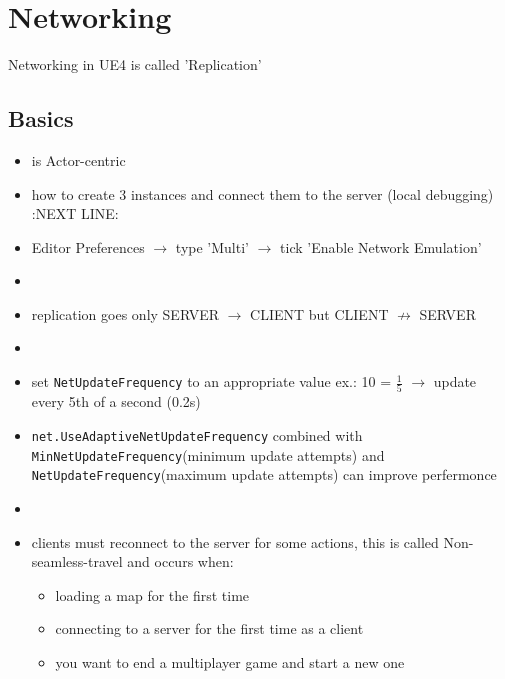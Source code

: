 \chapter{Networking}
    Networking in UE4 is called 'Replication'

    \section{Basics}
        \begin{itemize}
            \item is Actor-centric
            \item how to create 3 instances and connect them to the server (local debugging) :NEXT LINE:
            \item Editor Preferences $\rightarrow$ type 'Multi' $\rightarrow$ tick 'Enable Network Emulation'
            \item 
            \item replication goes only SERVER $\rightarrow$ CLIENT but CLIENT $\nrightarrow$ SERVER
            \item 
            \item set \colorbox{mygray}{\lstinline{NetUpdateFrequency}} to an appropriate value ex.: 10 = $\frac{1}{5}$ $\rightarrow$ update every 5th of a second (0.2s)
            \item \colorbox{mygray}{\lstinline{net.UseAdaptiveNetUpdateFrequency}} combined with \colorbox{mygray}{\lstinline{MinNetUpdateFrequency}}(minimum update attempts) and \colorbox{mygray}{\lstinline{NetUpdateFrequency}}(maximum update attempts) can improve perfermonce
            \item 
            \item clients must reconnect to the server for some actions, this is called Non-seamless-travel and occurs when:
            \begin{itemize}
                \item loading a map for the first time
                \item connecting to a server for the first time as a client
                \item you want to end a multiplayer game and start a new one
            \end{itemize}
        \end{itemize}

